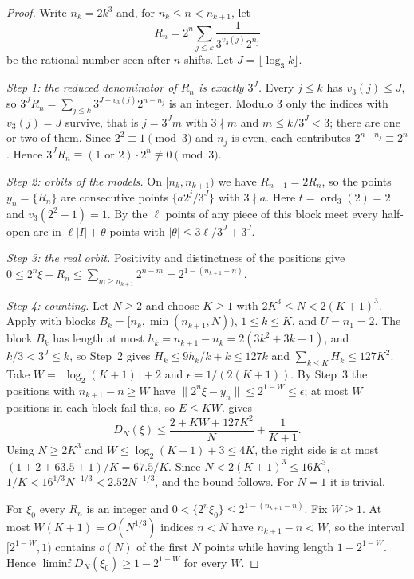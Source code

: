 \documentclass[11pt]{article}
\newcommand{\dist}[1]{\lVert #1\rVert}
\newcommand{\fr}[1]{\{#1\}}
\DeclareMathOperator{\ord}{ord}
\begin{document}
\begin{proof}
Write $n_k=2k^3$ and, for $n_k\le n<n_{k+1}$, let
\[
R_n=2^n\sum_{j\le k}\frac{1}{3^{v_3(j)}2^{n_j}}
\]
be the rational number seen after $n$ shifts. Let $J=\lfloor\log_3k\rfloor$.

\emph{Step 1: the reduced denominator of $R_n$ is exactly $3^J$.} Every $j\le k$ has
$v_3(j)\le J$, so $3^JR_n=\sum_{j\le k}3^{J-v_3(j)}2^{n-n_j}$ is an integer. Modulo $3$ only the
indices with $v_3(j)=J$ survive, that is $j=3^Jm$ with $3\nmid m$ and $m\le k/3^J<3$; there are one
or two of them. Since $2^2\equiv1\pmod3$ and $n_j$ is even, each contributes $2^{n-n_j}\equiv2^n$.
Hence $3^JR_n\equiv(1\text{ or }2)\cdot2^n\not\equiv0\pmod3$.

\emph{Step 2: orbits of the models.} On $[n_k,n_{k+1})$ we have $R_{n+1}=2R_n$, so the points
$y_n=\fr{R_n}$ are consecutive points $\fr{a2^j/3^J}$ with $3\nmid a$. Here $t=\ord_3(2)=2$ and
$v_3(2^2-1)=1$. By  the $\ell$ points of any piece of this block meet every
half-open arc in $\ell|I|+\theta$ points with $|\theta|\le3\ell/3^J+3^J$.

\emph{Step 3: the real orbit.} Positivity and distinctness of the positions give
$0\le2^n\xi-R_n\le\sum_{m\ge n_{k+1}}2^{n-m}=2^{1-(n_{k+1}-n)}$.

\emph{Step 4: counting.} Let $N\ge2$ and choose $K\ge1$ with $2K^3\le N<2(K+1)^3$. Apply
 with blocks $B_k=[n_k,\min(n_{k+1},N))$, $1\le k\le K$, and $U=n_1=2$. The
block $B_k$ has length at most $h_k=n_{k+1}-n_k=2(3k^2+3k+1)$, and $k/3<3^{J}\le k$, so Step~2 gives
$H_k\le9h_k/k+k\le127k$ and $\sum_{k\le K}H_k\le127K^2$. Take
$W=\lceil\log_2(K+1)\rceil+2$ and $\epsilon=1/(2(K+1))$. By Step~3 the positions with
$n_{k+1}-n\ge W$ have $\dist{2^n\xi-y_n}\le2^{1-W}\le\epsilon$; at most $W$ positions in each
block fail this, so $E\le KW$.  gives
\[
D_N(\xi)\le\frac{2+KW+127K^2}{N}+\frac1{K+1}.
\]
Using $N\ge2K^3$ and $W\le\log_2(K+1)+3\le4K$, the right side is at most
$(1+2+63.5+1)/K=67.5/K$. Since $N<2(K+1)^3\le16K^3$, $1/K<16^{1/3}N^{-1/3}<2.52N^{-1/3}$, and the
bound follows. For $N=1$ it is trivial.

For $\xi_0$ every $R_n$ is an integer and $0<\fr{2^n\xi_0}\le2^{1-(n_{k+1}-n)}$. Fix $W\ge1$. At
most $W(K+1)=O(N^{1/3})$ indices $n<N$ have $n_{k+1}-n<W$, so the interval $[2^{1-W},1)$ contains
$o(N)$ of the first $N$ points while having length $1-2^{1-W}$. Hence
$\liminf D_N(\xi_0)\ge1-2^{1-W}$ for every $W$.
\end{proof}
\end{document}
